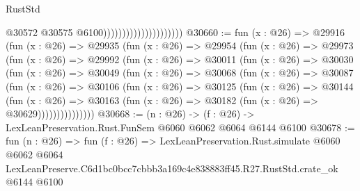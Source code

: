 \begin{lexlean}{RustStd}
\begin{coremodule}
                                              @30572
                                              @30575
                                              @6100)))))))))))))))))))))
@30660 := fun (x : @26) =>
  @29916
    (fun (x : @26) =>
    @29935
      (fun (x : @26) =>
      @29954
        (fun (x : @26) =>
        @29973
          (fun (x : @26) =>
          @29992
            (fun (x : @26) =>
            @30011
              (fun (x : @26) =>
              @30030
                (fun (x : @26) =>
                @30049
                  (fun (x : @26) =>
                  @30068
                    (fun (x : @26) =>
                    @30087
                      (fun (x : @26) =>
                      @30106
                        (fun (x : @26) =>
                        @30125
                          (fun (x : @26) =>
                          @30144
                            (fun (x : @26) =>
                            @30163 (fun (x : @26) => @30182 (fun (x : @26) => @30629)))))))))))))))
@30668 := (n : @26) -> (f : @26) -> LexLeanPreservation.Rust.FunSem @6060 @6062 @6064 @6144 @6100
@30678 := fun (n : @26) =>
  fun (f : @26) =>
  LexLeanPreservation.Rust.simulate
    @6060
    @6062
    @6064
    LexLeanPreserve.C6d1bc0bcc7cbbb3a169c4e838883ff45.R27.RustStd.crate_ok
    @6144
    @6100
\end{coremodule}
\end{lexlean}
